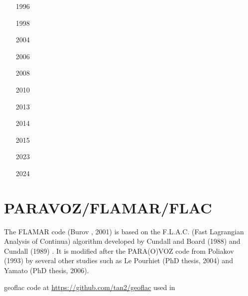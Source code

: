 \begin{small}
\begin{itemize}
\item[1996]
\textcite{trha96}
\item[1998]
\textcite{trha98}\textcite{trha98b}
\item[2004]
\textcite{goch04}
\item[2006]
\textcite{losh06}
\item[2008]
\textcite{loha08}\textcite{stha08}
\item[2010]
\textcite{stfh10}
\item[2013]
\textcite{stlh13}
\textcite{stha13}
\item[2014]
\textcite{stha14}
\item[2015]
\textcite{tosn15}
\item[2023]
\textcite{stha23}
\item[2024]
\textcite{stha24}
\end{itemize}
\end{small} 



\section{PARAVOZ/FLAMAR/FLAC}

The FLAMAR code (Burov \etal, 2001) is based on the
F.L.A.C. (Fast Lagrangian Analysis of Continua) algorithm developed by Cundall and Board (1988) 
and Cundall (1989) \cite{cund89}. It is modified after the PARA(O)VOZ code from 
Poliakov \etal (1993) \cite{pocp93} by several
other studies such as Le Pourhiet (PhD thesis, 2004) and Yamato (PhD thesis, 2006).

geoflac code at \url{https://github.com/tan2/geoflac} used in \cite{gojd23}

